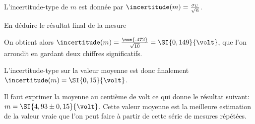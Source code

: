 
\pauseEntrainement

\smallskip
L'incertitude-type de $m$ est donnée par $\incertitude(m)=\frac{\sigma_U}{\sqrt{n}}$. 
\minusBigskip

\repriseEntrainement





\begin{enonce}
En déduire le résultat final de la mesure
\end{enonce}


\begin{corrige}
On obtient alors $\incertitude(m)=\frac{\num{.472}}{\sqrt{10}}=\SI{0,149}{\volt}$, que l'on arrondit en gardant deux chiffres significatifs. 

L'incertitude-type sur la valeur moyenne est donc finalement \(\incertitude(m)=\SI{0,15}{\volt}\).

 Il faut exprimer la moyenne au centième de volt ce qui donne le résultat suivant:
 $m=\SI{4,93 \pm 0,15}{\volt}$. Cette valeur moyenne est la meilleure estimation de la \og{}valeur vraie\fg{} que l'on peut faire à partir de cette série de mesures répétées.
\end{corrige}


\finEntrainement





\hauteurLargeurCadreReponse		{7mm}{3cm}
\initialisationEntrainement



